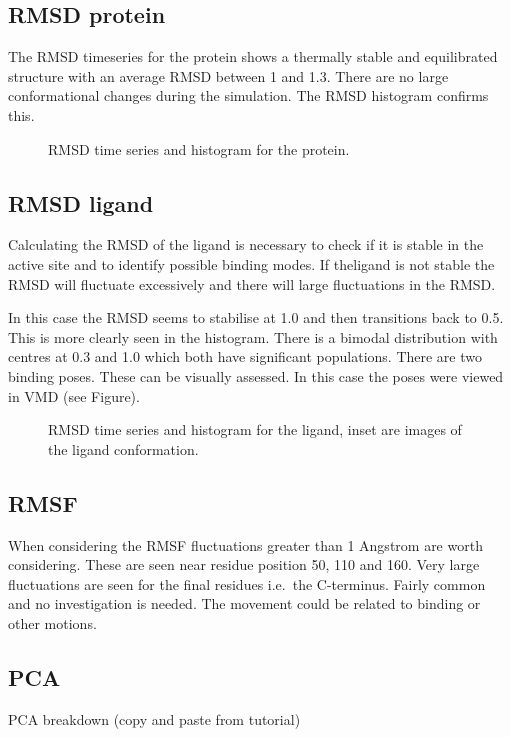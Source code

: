 \documentclass[twocolumn]{bmcart}%
\begin{document}
\subsection*{RMSD protein}
The RMSD timeseries for the protein shows a thermally stable and equilibrated structure with
an average RMSD between 1 and 1.3. There are no large conformational changes during the simulation. The RMSD histogram confirms this.

\begin{figure}[h!]
  \caption{
      RMSD time series and histogram for the protein.}
      \end{figure}

\subsection*{RMSD ligand}
Calculating the RMSD of the ligand is necessary to check if it is stable in the active site and to identify possible binding modes. If theligand is not stable the RMSD will fluctuate excessively and there will
large fluctuations in the RMSD.

In this case the RMSD seems to stabilise at 1.0 and then transitions back to 0.5. This is more clearly seen in the histogram. There is a bimodal distribution with centres at 0.3 and 1.0 which both have significant populations. There are two binding poses. These can be visually assessed. In this case the
poses were viewed in VMD \cite{hump_vmd_1996} (see Figure).

\begin{figure}[h!]
  \caption{
      RMSD time series and histogram for the ligand, inset are images of the ligand conformation.}
      \end{figure}

\subsection*{RMSF}
When considering the RMSF fluctuations greater than 1 Angstrom are worth
considering. These are seen near residue position 50, 110 and 160. Very
large fluctuations are seen for the final residues i.e.~the C-terminus.
Fairly common and no investigation is needed. The movement could be
related to binding or other motions.


\subsection*{PCA}
PCA breakdown (copy and paste from tutorial)
\end{document}
